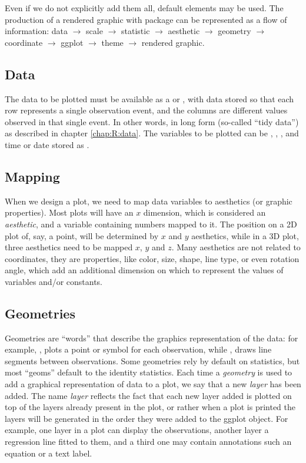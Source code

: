 \documentclass[krantz2]{krantz}\usepackage{knitr}
\begin{document}
Even if we do not explicitly add them all, default elements may be used. The production of a rendered graphic with package  can be represented as a flow of information:
\textsf{data $\to$ scale $\to$ statistic $\to$ aesthetic $\to$ geometry $\to$ coordinate $\to$ ggplot $\to$ theme $\to$ rendered graphic}.

\subsection{Data}
The data to be plotted must be available as a  or , with data stored so that each row represents a single observation event, and the columns are different values observed in that single event. In other words, in long form (so-called ``tidy data'') as described in chapter \ref{chap:R:data}. The variables to be plotted can be , , , and time or date stored as .

\subsection{Mapping}

When we design a plot, we need to map data variables to aesthetics (or graphic properties). Most plots will have an $x$ dimension, which is considered an \emph{aesthetic}, and a variable containing numbers mapped to it. The position on a 2D plot of, say, a point, will be determined by $x$ and $y$ aesthetics, while in a 3D plot, three aesthetics need to be mapped $x$, $y$ and $z$. Many aesthetics are not related to coordinates, they are properties, like color, size, shape, line type, or even rotation angle, which add an additional dimension on which to represent the values of variables and/or constants.

\subsection{Geometries}

\sloppy%
Geometries are ``words'' that describe the graphics representation of the data: for example, , plots a point or symbol for each observation, while , draws line segments between observations. Some geometries rely by default on statistics, but most ``geoms'' default to the identity statistics. Each time a \emph{geometry} is used to add a graphical representation of data to a plot, we say that a new \emph{layer} has been added. The name \emph{layer} reflects the fact that each new layer added is plotted on top of the layers already present in the plot, or rather when a plot is printed the layers will be generated in the order they were added to the ggplot object. For example, one layer in a plot can display the observations, another layer a regression line fitted to them, and a third one may contain annotations such an equation or a text label.
\end{document}
